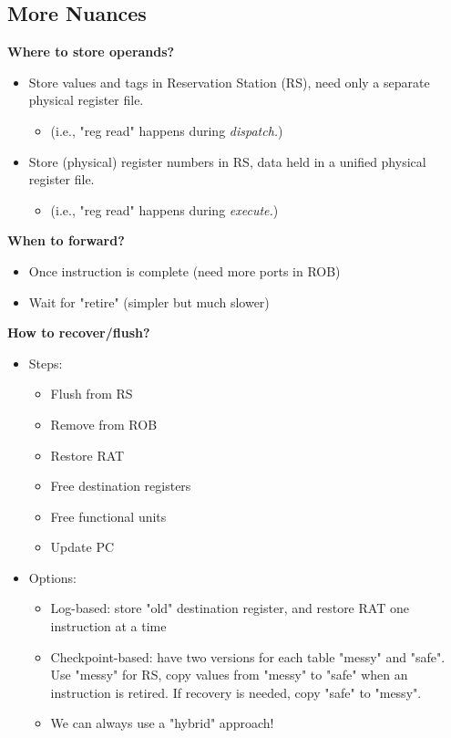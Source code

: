 \documentclass[10pt]{article}
\begin{document}
\subsection*{More Nuances}
\textbf{Where to store operands?}
\begin{itemize}
    \item Store values and tags in Reservation Station (RS), need only a separate physical register file.
    \begin{itemize}
        \item (i.e., "reg read" happens during \textit{dispatch.})
    \end{itemize}
    \item Store (physical) register numbers in RS, data held in a unified physical register file.
    \begin{itemize}
        \item (i.e., "reg read" happens during \textit{execute.})
    \end{itemize}
\end{itemize}
\textbf{When to forward?}
\begin{itemize}
    \item Once instruction is complete (need more ports in ROB)
    \item Wait for "retire" (simpler but much slower)
\end{itemize}
\textbf{How to recover/flush?}
\begin{itemize}
    \item Steps:
    \begin{itemize}
        \item Flush from RS
        \item Remove from ROB
        \item Restore RAT
        \item Free destination registers
        \item Free functional units
        \item Update PC
    \end{itemize}
    \item Options:
    \begin{itemize}
        \item Log-based: store "old" destination register, and restore RAT one instruction at a time
        \item Checkpoint-based: have two versions for each table "messy" and "safe".  Use "messy" for RS, copy values from "messy" to "safe" when an instruction is retired.  If recovery is needed, copy "safe" to "messy".
        \item We can always use a "hybrid" approach!
    \end{itemize}
\end{itemize}
\end{document}
